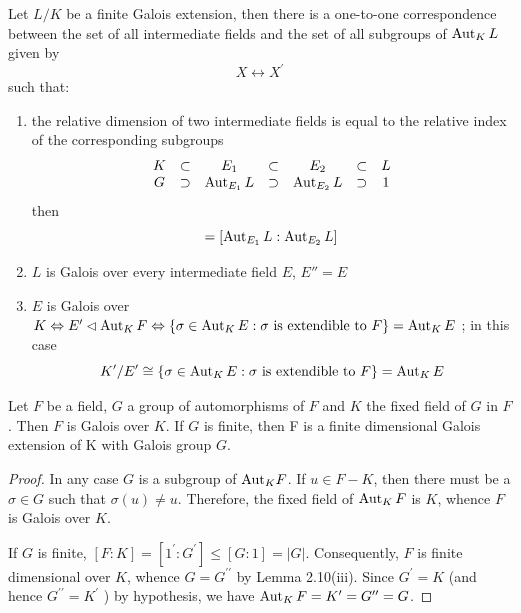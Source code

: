 \begin{theorem}
    Let $L/K$ be a finite Galois extension, then there is a one-to-one correspondence between the set of all intermediate fields and the set of all subgroups of $\operatorname{\operatorname{Aut}}_{ K } {L}$ given by
    \begin{equation*}
        X \leftrightarrow X^\prime
    \end{equation*}
    such that:
    \begin{enumerate}
        \item
              the relative dimension of two intermediate fields is equal to the relative index of the corresponding subgroups
              \begin{equation*}
                  \begin{matrix}
                      K & \subset & E_1         & \subset & E_2          & \subset & L \\
                      G & \supset & \operatorname{\operatorname{Aut}}_{E_1}L & \supset & \operatorname{\operatorname{Aut}}_{E_2} L & \supset & 1
                  \end{matrix}\end{equation*}
              then
              \begin{equation*}
                  [E_2:E_1] = [\Aut_{E_1} L : \Aut_{E_2}L]
              \end{equation*}
        \item
              $L$ is Galois over every intermediate field $E$, $E''=E$

        \item
              $E$ is Galois over $K \Leftrightarrow E^\prime \lhd \operatorname{\operatorname{Aut}}_K F \Leftrightarrow \left\{\sigma \in \operatorname{\operatorname{Aut}}_K E : \sigma \text{ is extendible to } F \right\}=\operatorname{\operatorname{Aut}}_K E$
              ; in this case
              \begin{equation*}
                  K' / E^\prime
                  \cong
                  \left\{\sigma \in \operatorname{\operatorname{Aut}}_K E : \sigma \text{ is extendible to } F \right\}
                  =
                  \operatorname{\operatorname{Aut}}_{ K } E
              \end{equation*}
    \end{enumerate}
\end{theorem}
\begin{theorem}[Artin]
    Let $F$ be a field, $G$ a group of automorphisms of $F$ and $K$ the fixed field of $G$ in $F$. Then $F$ is Galois over $K$.
    If $G$ is finite, then F is a finite dimensional Galois extension of K with Galois group $G$.
    \begin{proof}
        In any case $G$ is a subgroup of ${\operatorname{\operatorname{Aut}}}_K F$. If $u \in F-K$, then there must be a $\sigma \in G$ such that $\sigma(u) \neq u$. Therefore, the fixed field of $\operatorname{\operatorname{Aut}}_K F$ is $K$, whence $F$ is Galois over $K$.

        If $G$ is finite, $[F: K]=\left[1^\prime: G^\prime\right] \leq[G: 1]=|G|$. Consequently, $F$ is finite dimensional over $K$, whence $G=G^{\prime \prime}$ by Lemma 2.10(iii). Since $G^\prime=K$ (and hence $G^{\prime \prime}=K^\prime$ ) by hypothesis, we have $\operatorname{\operatorname{Aut}}_K F=K^\prime=G^{\prime \prime}=G$.
    \end{proof}
\end{theorem}

